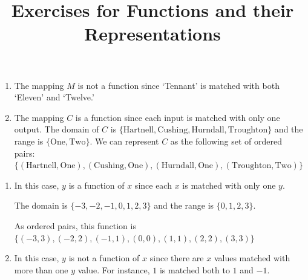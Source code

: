 \documentclass{ximera}
\title{Exercises for Functions and their Representations}
\begin{document}
\begin{abstract}
\end{abstract}
\maketitle






\begin{enumerate}

\item  The mapping $M$ is not a function since  `Tennant' is matched with both `Eleven' and `Twelve.'

\item  The mapping $C$ is a function since each input is matched with only one output.  The domain of $C$ is $\{ \text{Hartnell}, \text{Cushing}, \text{Hurndall}, \text{Troughton} \}$ and the range is $\{\text{One}, \text{Two} \}$.  We can represent $C$ as the following set of ordered pairs:  $\{ (\text{Hartnell}, \text{One}), (\text{Cushing}, \text{One}),  (\text{Hurndall}, \text{One}), (\text{Troughton}, \text{Two}) \}$

\end{enumerate}

\begin{enumerate}


\item  In this case, $y$ is a function of $x$ since each $x$ is matched with only one $y$.  

The domain is $\{ -3, -2, -1,0,1,2,3 \}$ and the range is $\{ 0,1,2,3 \}$.  

As ordered pairs, this function is $\{ (-3,3), (-2,2), (-1,1), (0,0), (1,1), (2,2), (3,3) \}$

\item  In this case, $y$ is not a function of $x$ since there are $x$ values matched with more than one $y$ value.  For instance, $1$ is matched both to $1$ and $-1$.

\end{enumerate}
\end{document}
